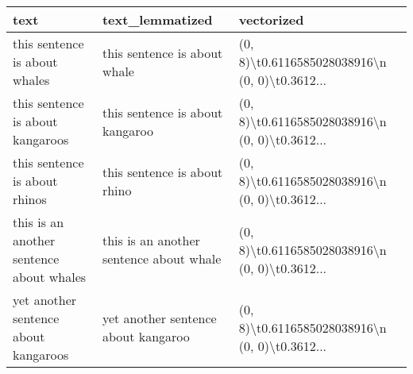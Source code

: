 \begin{tabular}{lll}
\toprule
                                     text &                          text\_lemmatized &                                         vectorized \\
\midrule
            this sentence is about whales &             this sentence is about whale &    (0, 8)\textbackslash t0.6116585028038916\textbackslash n  (0, 0)\textbackslash t0.3612... \\
         this sentence is about kangaroos &          this sentence is about kangaroo &    (0, 8)\textbackslash t0.6116585028038916\textbackslash n  (0, 0)\textbackslash t0.3612... \\
            this sentence is about rhinos &             this sentence is about rhino &    (0, 8)\textbackslash t0.6116585028038916\textbackslash n  (0, 0)\textbackslash t0.3612... \\
 this is an another sentence about whales &  this is an another sentence about whale &    (0, 8)\textbackslash t0.6116585028038916\textbackslash n  (0, 0)\textbackslash t0.3612... \\
     yet another sentence about kangaroos &      yet another sentence about kangaroo &    (0, 8)\textbackslash t0.6116585028038916\textbackslash n  (0, 0)\textbackslash t0.3612... \\
\bottomrule
\end{tabular}
